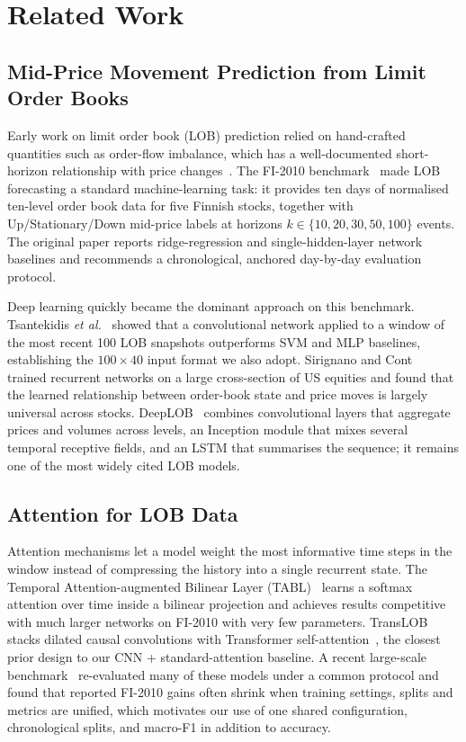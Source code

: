 \section{Related Work}
\label{sec:related}

\subsection{Mid-Price Movement Prediction from Limit Order Books}
Early work on limit order book (LOB) prediction relied on hand-crafted
quantities such as order-flow imbalance, which has a well-documented
short-horizon relationship with price changes~\cite{cont2014price}.
The FI-2010 benchmark~\cite{ntakaris2018benchmark} made LOB forecasting a
standard machine-learning task: it provides ten days of normalised
ten-level order book data for five Finnish stocks, together with
Up/Stationary/Down mid-price labels at horizons
$k \in \{10, 20, 30, 50, 100\}$ events. The original paper reports
ridge-regression and single-hidden-layer network baselines and recommends a
chronological, anchored day-by-day evaluation protocol.

Deep learning quickly became the dominant approach on this benchmark.
Tsantekidis \emph{et al.}~\cite{tsantekidis2017cnn} showed that a
convolutional network applied to a window of the most recent 100 LOB
snapshots outperforms SVM and MLP baselines, establishing the
$100 \times 40$ input format we also adopt. Sirignano and
Cont~\cite{sirignano2019universal} trained recurrent networks on a large
cross-section of US equities and found that the learned relationship between
order-book state and price moves is largely universal across stocks.
DeepLOB~\cite{zhang2019deeplob} combines convolutional layers that
aggregate prices and volumes across levels, an Inception module that mixes
several temporal receptive fields, and an LSTM that summarises the sequence;
it remains one of the most widely cited LOB models.

\subsection{Attention for LOB Data}
Attention mechanisms let a model weight the most informative time steps in
the window instead of compressing the history into a single recurrent state.
The Temporal Attention-augmented Bilinear Layer (TABL)~\cite{tran2019tabl}
learns a softmax attention over time inside a bilinear projection and
achieves results competitive with much larger networks on FI-2010 with very
few parameters. TransLOB~\cite{wallbridge2020translob} stacks dilated causal
convolutions with Transformer self-attention~\cite{vaswani2017attention},
the closest prior design to our CNN + standard-attention baseline. A
recent large-scale benchmark~\cite{prata2024lobcast} re-evaluated many of
these models under a common protocol and found that reported FI-2010 gains
often shrink when training settings, splits and metrics are unified, which
motivates our use of one shared configuration, chronological splits, and
macro-F1 in addition to accuracy.

